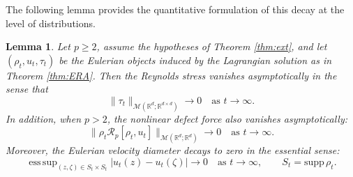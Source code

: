 \documentclass[10pt,reqno]{amsart}
\DeclareMathOperator*{\esssup}{ess\,sup}
\renewcommand{\geq}{\geqslant}
\numberwithin{equation}{section}
\newtheorem{lemma}{Lemma}[section]
\newcommand{\R}{\mathbb R}
\newcommand{\calM}{\mathcal M}
\newcommand{\calR}{\mathcal R}
\begin{document}
The following lemma provides the quantitative formulation of this decay at the level of distributions.

\begin{lemma}\label{lem:asymp_closure}
Let $p \geq 2$, assume the hypotheses of Theorem \ref{thm:ext}, and let $(\rho_t,u_t,\tau_t)$ be the Eulerian objects induced by the Lagrangian solution as in Theorem \ref{thm:ERA}. Then the Reynolds stress vanishes asymptotically in the sense that
\[
\|\tau_t\|_{\calM(\R^d;\R^{d\times d})} \to 0 \quad \text{as }t\to\infty.
\]
In addition, when $p>2$, the nonlinear defect force also vanishes asymptotically:
\[
\|\rho_t \calR_p[\rho_t,u_t]\|_{\calM(\R^d;\R^d)} \to 0 \quad \text{as }t\to\infty.
\]
Moreover, the Eulerian velocity diameter decays to zero in the essential sense:
\[
\esssup_{(z,\zeta)\in S_t\times S_t}|u_t(z)-u_t(\zeta)|
\to 0 \quad \text{as }t\to\infty, \qquad S_t=\text{supp}\,\rho_t.
\]
\end{lemma}
\end{document}
